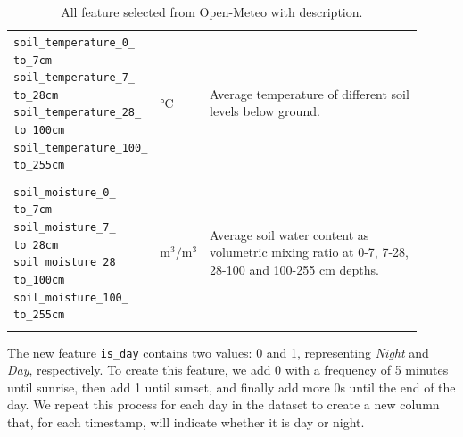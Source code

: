 \begin{longtable}[c]{p{0.3\linewidth}|p{0.07\linewidth}| p{0.54\linewidth}}
	\verb|soil_temperature_0_| \verb|   to_7cm| \verb|soil_temperature_7_| \verb|   to_28cm| \verb|soil_temperature_28_| \verb|   to_100cm| \verb|soil_temperature_100_| \verb|   to_255cm| & °C                      & Average temperature of different soil levels below ground.                                                                                                                                                                                                                                             \\
	                                                                                                                                                                                        &                         &                                                                                                                                                                                                                                                                                                        \\
	\verb|soil_moisture_0_| \verb|   to_7cm| \verb|soil_moisture_7_| \verb|   to_28cm| \verb|soil_moisture_28_| \verb|   to_100cm| \verb|soil_moisture_100_| \verb|   to_255cm|             & $\text{m}^3/\text{m}^3$ & Average soil water content as volumetric mixing ratio at 0-7, 7-28, 28-100 and 100-255 cm depths.                                                                                                                                                                                                      \\
	\caption{All feature selected from Open-Meteo with description\cite{openmeteo}.}\label{tab:openmeteofeatures}
\end{longtable}
\newpage
The new feature \texttt{is\_day} contains two values: 0 and 1,
representing \textit{Night} and \textit{Day}, respectively.
To create this feature, we add 0 with a frequency of 5 minutes until sunrise,
then add 1 until sunset, and finally add more 0s until the end of the day.
We repeat this process for each day in the dataset to create a new column that,
for each timestamp, will indicate whether it is day or night.


